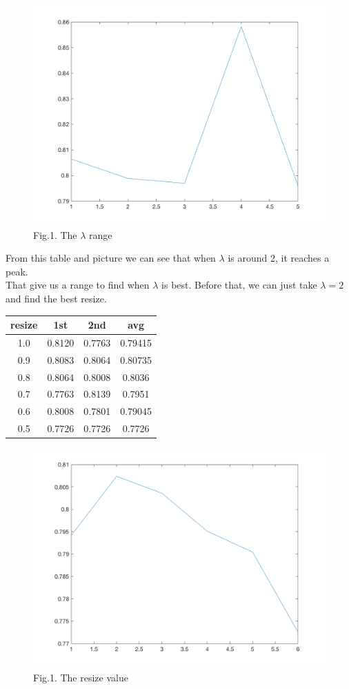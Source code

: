 \documentclass[sigconf]{acmart}
\begin{document}
\begin{figure}
    \centering
    \includegraphics[width=0.9\columnwidth]{lambda.png}
    \caption{Fig.1. The $\lambda$ range}
\end{figure}

From this table and picture we can see that when $\lambda$ is around 2, it reaches a peak.\\

That give us a range to find when $\lambda$ is best. Before that, we can just take $\lambda = 2$ and find the best resize.\\

\begin{center}
	\begin{tabular}{cccc}
	\hline
	resize& 1st& 2nd& avg\\
	\hline
	1.0& 0.8120& 0.7763& 0.79415\\
	0.9& 0.8083& 0.8064& 0.80735\\
	0.8& 0.8064& 0.8008& 0.8036\\
	0.7& 0.7763& 0.8139& 0.7951\\
	0.6& 0.8008& 0.7801& 0.79045\\
	0.5& 0.7726& 0.7726& 0.7726\\
	\hline
	\end{tabular}
\end{center}

\begin{figure}
    \centering
    \includegraphics[width=0.9\columnwidth]{resize.png}
    \caption{Fig.1. The resize value}
\end{figure}
\end{document}
